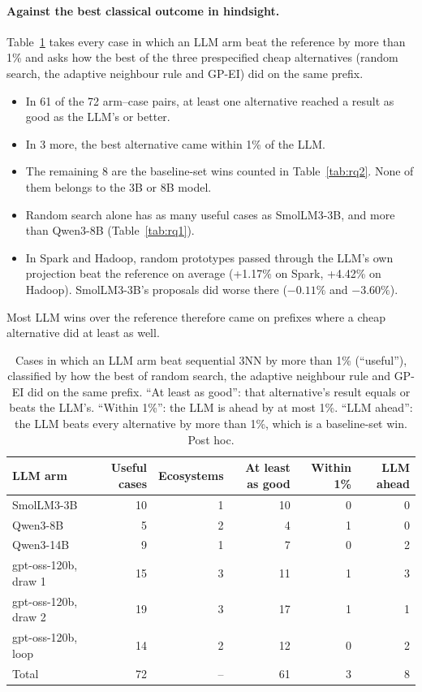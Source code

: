\paragraph{Against the best classical outcome in hindsight.} Table~\ref{tab:match} takes every case in which an LLM arm beat the reference by more than 1\% and asks how the best of the three prespecified cheap alternatives (random search, the adaptive neighbour rule and GP-EI) did on the same prefix.
\begin{itemize}
  \item In 61 of the 72 arm--case pairs, at least one alternative reached a result as good as the LLM's or better.
  \item In 3 more, the best alternative came within 1\% of the LLM.
  \item The remaining 8 are the baseline-set wins counted in Table~\ref{tab:rq2}. None of them belongs to the 3B or 8B model.
  \item Random search alone has as many useful cases as SmolLM3-3B, and more than Qwen3-8B (Table~\ref{tab:rq1}).
  \item In Spark and Hadoop, random prototypes passed through the LLM's own projection beat the reference on average (+1.17\% on Spark, +4.42\% on Hadoop). SmolLM3-3B's proposals did worse there ($-0.11\%$ and $-3.60\%$).
\end{itemize}
Most LLM wins over the reference therefore came on prefixes where a cheap alternative did at least as well.

\begin{table}[t]
\centering
\caption{Cases in which an LLM arm beat sequential 3NN by more than 1\% (``useful''), classified by how the best of random search, the adaptive neighbour rule and GP-EI did on the same prefix. ``At least as good'': that alternative's result equals or beats the LLM's. ``Within 1\%'': the LLM is ahead by at most 1\%. ``LLM ahead'': the LLM beats every alternative by more than 1\%, which is a baseline-set win. Post hoc.}
\label{tab:match}
\small
\begin{tabular}{lrrrrr}
\toprule
LLM arm & Useful cases & Ecosystems & At least as good & Within 1\% & LLM ahead \\
\midrule
SmolLM3-3B & 10 & 1 & 10 & 0 & 0 \\
Qwen3-8B & 5 & 2 & 4 & 1 & 0 \\
Qwen3-14B & 9 & 1 & 7 & 0 & 2 \\
gpt-oss-120b, draw 1 & 15 & 3 & 11 & 1 & 3 \\
gpt-oss-120b, draw 2 & 19 & 3 & 17 & 1 & 1 \\
gpt-oss-120b, loop & 14 & 2 & 12 & 0 & 2 \\
\midrule
Total & 72 & -- & 61 & 3 & 8 \\
\bottomrule
\end{tabular}
\end{table}

